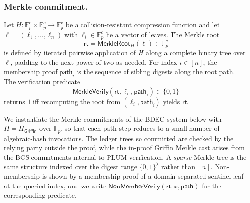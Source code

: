 \subsubsection{Merkle commitment.}
\begin{definition}\label{def:merkle}
Let $H:\mathbb{F}_p^{c}\times\mathbb{F}_p^{c}\to\mathbb{F}_p^{c}$ be a collision-resistant compression function and let $\ell=(\ell_1,\ldots,\ell_n)$ with $\ell_i\in\mathbb{F}_p^{c}$ be a vector of leaves. The Merkle root
\begin{equation*}
  \mathsf{rt}=\mathsf{MerkleRoot}_H(\ell)\in\mathbb{F}_p^{c}
\end{equation*}
is defined by iterated pairwise application of $H$ along a complete binary tree over $\ell$, padding to the next power of two as needed. For index $i\in[n]$, the membership proof $\mathsf{path}_i$ is the sequence of sibling digests along the root path. The verification predicate
\begin{equation*}
  \mathsf{MerkleVerify}(\mathsf{rt},\ell_i,\mathsf{path}_i)\in\{0,1\}
\end{equation*}
returns $1$ iff recomputing the root from $(\ell_i,\mathsf{path}_i)$ yields $\mathsf{rt}$.
\end{definition}

We instantiate the Merkle commitments of the BDEC system below with $H=H_{\mathsf{Griffin}}$ over $\mathbb{F}_p$, so that each path step reduces to a small number of algebraic-hash invocations. The ledger trees so committed are checked by the relying party outside the proof, while the in-proof Griffin Merkle cost arises from the BCS commitments internal to PLUM verification. A \emph{sparse} Merkle tree is the same structure indexed over the digest range $\{0,1\}^{\lambda}$ rather than $[n]$. Non-membership is shown by a membership proof of a domain-separated sentinel leaf at the queried index, and we write $\mathsf{NonMemberVerify}(\mathsf{rt},x,\mathsf{path})$ for the corresponding predicate.

